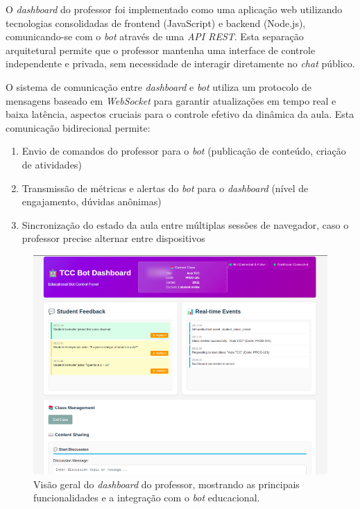 O \textit{dashboard} do professor foi implementado como uma aplicação web
utilizando tecnologias consolidadas de frontend (JavaScript) e backend
(Node.js), comunicando-se com o \textit{bot} através de uma \textit{API REST}.
Esta separação arquitetural permite que o professor mantenha uma interface de
controle independente e privada, sem necessidade de interagir diretamente no
\textit{chat} público.

O sistema de comunicação entre \textit{dashboard} e \textit{bot} utiliza um
protocolo de mensagens baseado em \textit{WebSocket} para garantir atualizações
em tempo real e baixa latência, aspectos cruciais para o controle efetivo da
dinâmica da aula. Esta comunicação bidirecional permite:

\begin{enumerate}
\item Envio de comandos do professor para o \textit{bot} (publicação de
conteúdo, criação de atividades)
\item Transmissão de métricas e alertas do \textit{bot} para o
\textit{dashboard} (nível de engajamento, dúvidas anônimas)
\item Sincronização do estado da aula entre múltiplas sessões de navegador, caso
o professor precise alternar entre dispositivos
\end{enumerate}

\begin{figure}[H] \centering
\centering
\includegraphics[width=16cm]{dashboard-preview.png}
\caption{Visão geral do \textit{dashboard} do professor, mostrando as principais
funcionalidades e a integração com o \textit{bot} educacional.}
\label{fig:dashboard-preview}
\end{figure}

